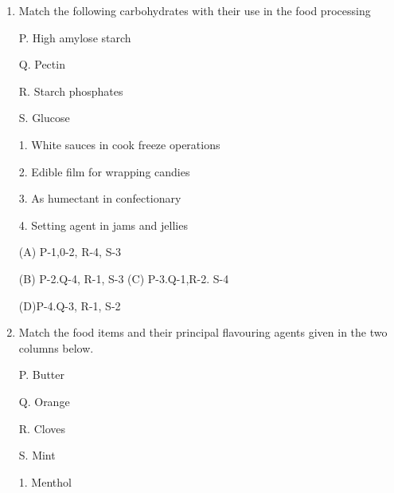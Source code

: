 \documentclass[journal]{IEEEtran}
\begin{document}
\begin{enumerate}
at elevated temperature

(A) P-4.0-2.R-3,S1

(B) P-3, 0-4, R-1.S-2

(C) P-1, Q 3, R-2, S-4

(D) P-2.0-1.R-4.S-3

\item {Match the following carbohydrates with their use in the food processing}
\begin{minipage}{0.5\textwidth}
	\begin{flushleft}

P. High amylose starch

Q. Pectin

R. Starch phosphates

S. Glucose


		\end{flushleft}
		\end{minipage}
	\begin{minipage}{0.5\textwidth}
		\begin{flushleft}

1. White sauces in cook freeze operations

2. Edible film for wrapping candies


3. As humectant in confectionary

4. Setting agent in jams and jellies
		\end{flushleft}
		\end{minipage}



(A) P-1,0-2, R-4, S-3

(B) P-2.Q-4, R-1, S-3
(C) P-3.Q-1,R-2. S-4


(D)P-4.Q-3, R-1, S-2

\item {Match the food items and their principal flavouring agents given in the two columns below.}
	\newline
\begin{minipage}{0.5\textwidth}
	\begin{flushleft}

P. Butter

Q. Orange


R. Cloves

S. Mint
		\end{flushleft}
		\end{minipage}
	\begin{minipage}{0.5\textwidth}
		\begin{flushleft}
1. Menthol



\end{flushleft}
\end{minipage}
\end{enumerate}
\end{document}
